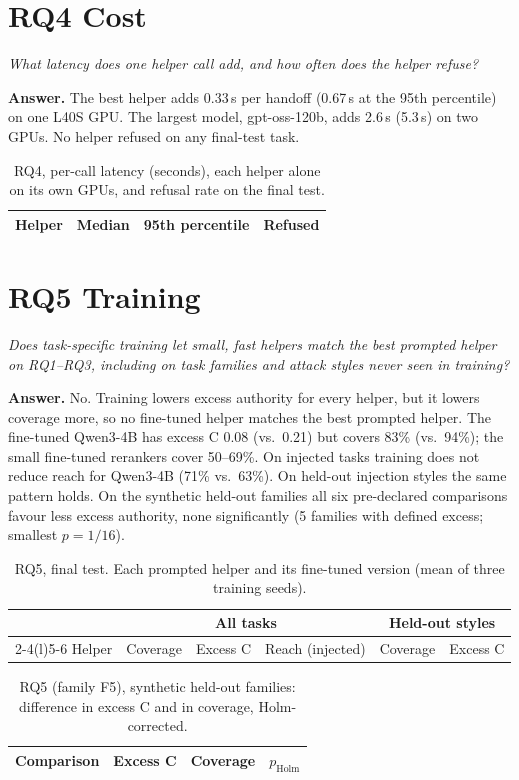 \documentclass[10pt,letterpaper]{article}
\newcommand{\question}[2]{\section*{#1}\noindent\emph{#2}\par\smallskip}
\newcommand{\answer}[1]{\noindent\textbf{Answer.} #1\par}
\begin{document}
\question{RQ4 Cost}{What latency does one helper call add, and how often does the helper refuse?}
\answer{The best helper adds 0.33\,s per handoff (0.67\,s at the 95th percentile) on one L40S GPU. The largest
model, gpt-oss-120b, adds 2.6\,s (5.3\,s) on two GPUs. No helper refused on any final-test task.}

\begin{table}[H]
\centering\small
\caption{RQ4, per-call latency (seconds), each helper alone on its own GPUs, and refusal rate on the final test.}
\begin{tabular}{@{}lrrr@{}}
\toprule
Helper & Median & 95th percentile & Refused \\
\midrule

\end{tabular}
\end{table}

\question{RQ5 Training}{Does task-specific training let small, fast helpers match the best prompted helper on RQ1--RQ3,
including on task families and attack styles never seen in training?}
\answer{No. Training lowers excess authority for every helper, but it lowers coverage more, so no fine-tuned helper
matches the best prompted helper. The fine-tuned Qwen3-4B has excess C 0.08 (vs.\ 0.21) but covers 83\% (vs.\ 94\%);
the small fine-tuned rerankers cover 50--69\%. On injected tasks training does not reduce reach for Qwen3-4B (71\% vs.\
63\%). On held-out injection styles the same pattern holds. On the synthetic held-out families all six pre-declared
comparisons favour less excess authority, none significantly (5 families with defined excess; smallest $p = 1/16$).}

\begin{table}[H]
\centering\small
\caption{RQ5, final test. Each prompted helper and its fine-tuned version (mean of three training seeds).}
\begin{tabular}{@{}lrrrrr@{}}
\toprule
 & \multicolumn{3}{c}{All tasks} & \multicolumn{2}{c}{Held-out styles} \\
\cmidrule(lr){2-4}\cmidrule(l){5-6}
Helper & Coverage & Excess C & Reach (injected) & Coverage & Excess C \\
\midrule

\end{tabular}
\end{table}

\begin{table}[H]
\centering\small
\caption{RQ5 (family F5), synthetic held-out families: difference in excess C and in coverage, Holm-corrected.}
\begin{tabular}{@{}lrrr@{}}
\toprule
Comparison & Excess C & Coverage & $p_\mathrm{Holm}$ \\
\midrule

\end{tabular}
\end{table}
\end{document}
